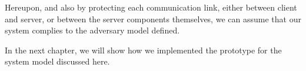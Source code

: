 Hereupon, and also by protecting each communication link, either between client and server, or between the server components themselves, we can assume that our system complies to the adversary model defined.

In the next chapter, we will show how we implemented the prototype for the system model discussed here.

% 
% 
% 
% 



